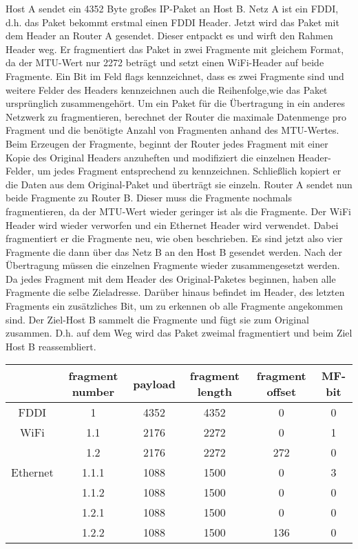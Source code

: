 \documentclass[paper=a4, fontsize=11pt]{scrartcl}
\numberwithin{equation}{section}
\numberwithin{figure}{section}
\numberwithin{table}{section}
\begin{document}
Host A sendet ein 4352 Byte großes IP-Paket an Host B. Netz A ist ein FDDI, d.h. das Paket bekommt erstmal einen FDDI Header. Jetzt wird das Paket mit dem Header an Router A gesendet. Dieser entpackt es und wirft den Rahmen Header weg. Er fragmentiert das Paket in zwei Fragmente mit gleichem Format, da der MTU-Wert nur 2272 beträgt und setzt einen WiFi-Header auf beide Fragmente. Ein Bit im Feld flags kennzeichnet, dass es zwei Fragmente sind und weitere Felder des Headers kennzeichnen auch die Reihenfolge,wie das Paket ursprünglich zusammengehört. Um ein Paket für die Übertragung in ein anderes Netzwerk zu fragmentieren, berechnet der Router die maximale Datenmenge pro Fragment und die benötigte Anzahl von Fragmenten anhand des MTU-Wertes. Beim Erzeugen der Fragmente, beginnt der Router jedes Fragment mit einer Kopie des Original Headers anzuheften und modifiziert die einzelnen Header-Felder, um jedes Fragment entsprechend zu kennzeichnen. Schließlich kopiert er die Daten aus dem Original-Paket und überträgt sie einzeln.
Router A sendet nun beide Fragmente zu Router B. Dieser muss die Fragmente nochmals fragmentieren, da der MTU-Wert wieder geringer ist als die Fragmente. Der WiFi Header wird wieder verworfen und ein Ethernet Header wird verwendet. Dabei fragmentiert er die Fragmente neu, wie oben beschrieben. Es sind jetzt also vier Fragmente die dann über das Netz B an den Host B gesendet werden. Nach der Übertragung müssen die einzelnen Fragmente wieder zusammengesetzt werden. Da jedes Fragment mit dem Header des Original-Paketes beginnen, haben alle Fragmente die selbe Zieladresse. Darüber hinaus befindet im Header, des letzten Fragments ein zusätzliches Bit, um zu erkennen ob alle Fragmente angekommen sind. Der Ziel-Host B sammelt die Fragmente und fügt sie zum Original zusammen. D.h. auf dem Weg wird das Paket zweimal fragmentiert und beim Ziel Host B reassembliert. \\

\begin{tabular}{|c|c|c|c|c|c|}
\hline
 & fragment number &  payload & fragment length & fragment offset & MF-bit \\\hline
FDDI & 1 & 4352 & 4352 & 0 & 0\\\hline
WiFi & 1.1 & 2176 & 2272 & 0 & 1\\
     & 1.2 & 2176 & 2272 & 272 & 0\\\hline
Ethernet & 1.1.1 & 1088 & 1500 & 0 & 3\\
         & 1.1.2 & 1088 & 1500 & 0 & 0\\
         & 1.2.1 & 1088 & 1500 & 0 & 0\\
         & 1.2.2 & 1088 & 1500 & 136 & 0\\\hline
\end{tabular}
\end{document}
